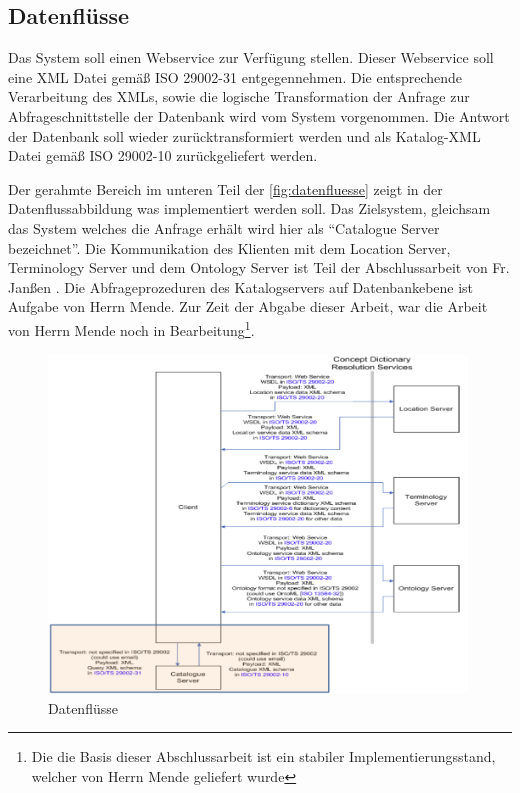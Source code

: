 \subsection{Datenflüsse}
Das System soll einen \gls{Webservice} zur Verfügung stellen. Dieser \gls{Webservice} soll eine XML Datei gemäß ISO 29002-31 entgegennehmen. Die entsprechende Verarbeitung des XMLs, sowie die logische Transformation der Anfrage zur Abfrageschnittstelle der Datenbank wird vom System vorgenommen. Die Antwort der Datenbank soll wieder zurücktransformiert werden und als Katalog-XML Datei gemäß ISO 29002-10 zurückgeliefert werden.
 
Der gerahmte Bereich im unteren Teil der \autoref{fig:datenfluesse} zeigt in der Datenflussabbildung was implementiert werden soll. Das Zielsystem, gleichsam das System welches die Anfrage erhält wird hier als \enquote{Catalogue Server bezeichnet}. 
Die Kommunikation des Klienten mit dem Location Server, Terminology Server und dem Ontology Server ist Teil der Abschlussarbeit von Fr. Janßen \citep[Vergl.][]{janssen}. 
Die Abfrageprozeduren des Katalogservers auf Datenbankebene ist Aufgabe von Herrn Mende. Zur Zeit der Abgabe dieser Arbeit, war die Arbeit von Herrn Mende noch in Bearbeitung\footnote{Die die Basis dieser Abschlussarbeit ist ein stabiler Implementierungsstand, welcher von Herrn Mende geliefert wurde}. 

\begin{figure}[htbp]
	\centering
		\includegraphics[width=0.99\textwidth]{images/datenfluesse_plib.png}
	\caption[Datenflüsse]{Datenflüsse\footnotemark}
	\label{fig:datenfluesse}
\end{figure}
